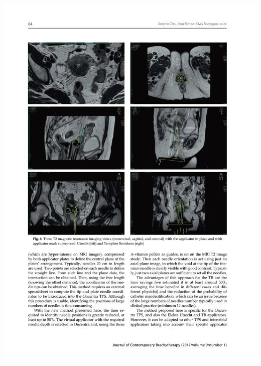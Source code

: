 \documentclass[
  a4paper,
]{scrreprt}
\begin{document}
\includegraphics{articulos/librerias/librerias-6.png}
\end{document}

